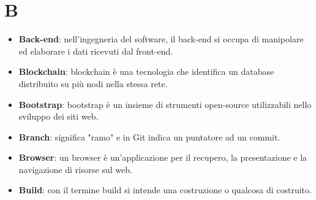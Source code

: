 \documentclass[a4paper, oneside, openany]{article}
\begin{document}
\section{B}
\begin{itemize}
\item \textbf{Back-end}: nell'ingegneria del software, il back-end si occupa di manipolare ed elaborare i dati ricevuti dal front-end.	
\item \textbf{Blockchain}: blockchain è una tecnologia che identifica un database distribuito su più nodi nella stessa rete.
\item \textbf{Bootstrap}: bootstrap è un insieme di strumenti open-source utilizzabili nello sviluppo dei siti web.
\item \textbf{Branch}: significa "ramo" e in Git indica un puntatore ad un commit.
\item \textbf{Browser}: un browser è un'applicazione per il recupero, la presentazione e la navigazione di risorse sul web.
\item \textbf{Build}: con il termine build si intende una costruzione o qualcosa di costruito.
\end{itemize}
\end{document}
